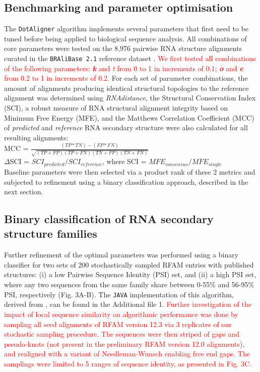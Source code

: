 \documentclass{bmcart}
\newcommand\dotaligner{\texttt{DotAligner}}
\newcommand\bralibase{\texttt{BRAliBase 2.1}}
\begin{document}
\subsection*{Benchmarking and parameter optimisation}

The \dotaligner{} algorithm implements several parameters that
first need to be tuned before being applied to biological sequence
analysis. All combinations of core parameters were tested on the 8,976
pairwise RNA structure alignments curated in the \bralibase{} reference dataset
\cite{wilm2006enhanced}. \textcolor{red}{We first tested all combinations of the following parameters: \textit{\textbf{k}} and \textit{\textit{t}} from 0 to 1 in increments of 0.1;  \textit{\textbf{o}} and \textbf{\textit{e}} from 0.2 to 1 in increments of 0.2.} 
For each set of parameter combinations, the amount of
alignments producing identical structural topologies to the reference alignment
was determined using \textit{RNAdistance}, the Structural Conservation Index
(SCI), a robust measure of RNA structural alignment integrity
\cite{gruber2008strategies} based on Minimum Free Energy (MFE), and the Matthews Correlation Coefficient (MCC) of \textit{predicted} and \textit{reference} RNA secondary structure
were also calculated for all resulting alignments: \\

MCC = $\frac{(TP * TN) - (FP * FN)}{ \sqrt{ (TP + FP)(TP + FN)(TN + FP)(TN + FN) }}$\\

$\Delta$SCI = $SCI_{predicted} / SCI_{reference}$, where SCI = $ MFE_{consensus}  / \overline{MFE}_{single}  $\\

Baseline parameters were then selected via a product rank of these 2 metrics 
and subjected to refinement using a binary classification approach, described in the next section. 

\subsection*{Binary classification of RNA secondary structure families}
Further refinement of the optimal parameters was performed using a binary classifier for two sets of 
200 stochastically sampled RFAM entries with published structures: 
(i) a low Pairwise Sequence Identity (PSI) set, and (ii) a high PSI set, 
where any two sequences from the same family share between 0-55\% and 56-95\% PSI, respectively (Fig. 3A-B). 
The \texttt{JAVA} implementation of this algorithm, derived from \cite{smith2013widespread}, can be found in the Additional file 1. \textcolor{red}{Further investigation of the impact of local sequence similarity on algorithmic 
performance was done by sampling all seed alignments of RFAM version 12.3 via 3 replicates of
our stochastic sampling procedure. The sequences were then striped of gaps and pseudo-knots 
(not present in the preliminary RFAM version 12.0 alignments), and realigned with a variant of 
Needleman-Wunsch enabling free end gaps. The samplings were limited to 5 ranges of sequence identity, as
presented in Fig. 3C. }\\
\end{document}
